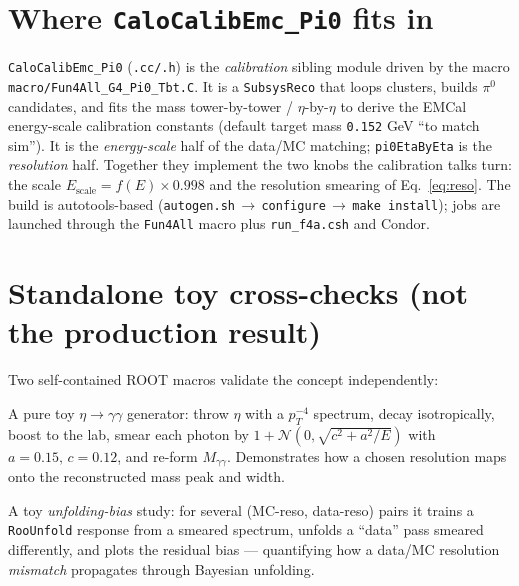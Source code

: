 \documentclass[11pt]{article}
\begin{document}
\section{Where \texttt{CaloCalibEmc\_Pi0} fits in}
\texttt{CaloCalibEmc\_Pi0} (\texttt{.cc/.h}) is the \emph{calibration} sibling
module driven by the macro \texttt{macro/Fun4All\_G4\_Pi0\_Tbt.C}. It is a
\texttt{SubsysReco} that loops clusters, builds $\pi^0$ candidates, and fits the
mass tower-by-tower / $\eta$-by-$\eta$ to derive the EMCal energy-scale calibration
constants (default target mass \texttt{0.152} GeV ``to match sim''). It is the
\emph{energy-scale} half of the data/MC matching; \texttt{pi0EtaByEta} is the
\emph{resolution} half. Together they implement the two knobs the calibration talks
turn: the scale $E_{\text{scale}}=f(E)\times0.998$ and the resolution smearing of
Eq.~\eqref{eq:reso}. The build is autotools-based
(\texttt{autogen.sh}\,$\to$\,\texttt{configure}\,$\to$\,\texttt{make install});
jobs are launched through the \texttt{Fun4All} macro plus \texttt{run\_f4a.csh} and
Condor.

\section{Standalone toy cross-checks (not the production result)}
Two self-contained ROOT macros validate the concept independently:
\begin{description}[leftmargin=1.2em,style=nextline]
\item[\texttt{eta\_decay\_simulation\_with\_smearing.C}] A pure toy
  $\eta\to\gamma\gamma$ generator: throw $\eta$ with a $p_T^{-4}$ spectrum, decay
  isotropically, boost to the lab, smear each photon by
  $1+\mathcal{N}(0,\sqrt{c^2+a^2/E})$ with $a=0.15,\,c=0.12$, and re-form
  $M_{\gamma\gamma}$. Demonstrates how a chosen resolution maps onto the
  reconstructed mass peak and width.
\item[\texttt{resolutionsim.C}] A toy \emph{unfolding-bias} study: for several
  (MC-reso, data-reso) pairs it trains a \texttt{RooUnfold} response from a smeared
  spectrum, unfolds a ``data'' pass smeared differently, and plots the residual
  bias --- quantifying how a data/MC resolution \emph{mismatch} propagates through
  Bayesian unfolding.
\end{description}
\end{document}
